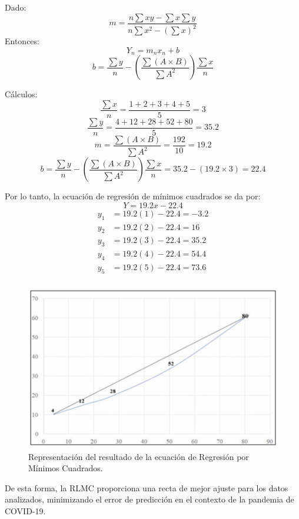 \documentclass[12pt]{article}
\begin{document}
        Dado:
        \[
        m = \frac{n \sum xy - \sum x \sum y}{n \sum x^{2} - (\sum x)^2}
        \]
        Entonces:
        \[
        Y_n = m_n x_n + b 
        \]
        \[
        b = \frac{\sum y}{n} - \left( \frac{\sum (A \times B)}{\sum A^2} \right) \frac{\sum x}{n} 
        \]
        
        Cálculos:
        \[
        \frac{\sum x}{n} = \frac{1 + 2 + 3 + 4 + 5}{5} = 3
        \]
        \[
        \frac{\sum y}{n} = \frac{4 + 12 + 28 + 52 + 80}{5} = 35.2
        \]
        \[
        m = \frac{\sum (A \times B)}{\sum A^2} = \frac{192}{10} = 19.2
        \]
        \[
        b = \frac{\sum y}{n} - \left( \frac{\sum (A \times B)}{\sum A^2} \right) \frac{\sum x}{n} = 35.2 - (19.2 \times 3) = 22.4
        \]
        
        Por lo tanto, la ecuación de regresión de mínimos cuadrados se da por:
        \[
        Y = 19.2x - 22.4
        \]
        \[
        \begin{aligned}
                y_1 &= 19.2(1) - 22.4 = -3.2 \\
                y_2 &= 19.2(2) - 22.4 = 16 \\
                y_3 &= 19.2(3) - 22.4 = 35.2 \\
                y_4 &= 19.2(4) - 22.4 = 54.4 \\
                y_5 &= 19.2(5) - 22.4 = 73.6 \\
        \end{aligned}
        \]
        
        \begin{figure}[!h]
                \centering
                \includegraphics[width=0.7\linewidth]{imagenes/Imagen2}
                \caption{Representación del resultado de la ecuación de Regresión por Mínimos Cuadrados.}
                \label{fig:Imagen2}
        \end{figure}
        
        \noindent
        De esta forma, la RLMC proporciona una recta de mejor ajuste para los datos analizados, minimizando el error de predicción en el contexto de la pandemia de COVID-19.
        
\end{document}
